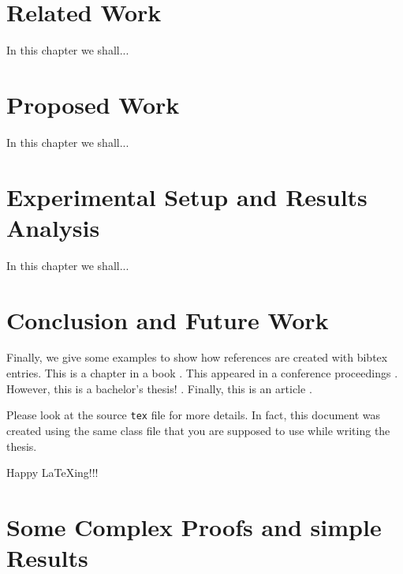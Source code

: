 \documentclass{mnnit}
\begin{document}
\chapter{Related Work}
In this chapter we shall...

\chapter{Proposed Work}
In this chapter we shall...


\chapter{Experimental Setup and Results Analysis}
In this chapter we shall...





\chapter{Conclusion and Future Work}
Finally, we give some examples to show how references are created
with bibtex entries. This is a chapter in a book \cite{Kristen}.
This appeared in a conference proceedings \cite{Chen}. However,
this is a bachelor's thesis! \cite{claus}. Finally, this is an
article \cite{Normark}.

Please look at the source \texttt{tex} file for more details. In
fact, this document was created using the same class file that you
are supposed to use while writing the thesis.

Happy \LaTeX ing!!!


\appendix
\chapter{Some Complex Proofs and simple Results}








\end{document}
